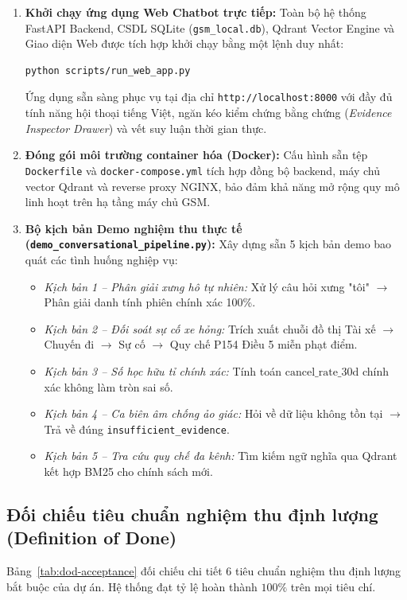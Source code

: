 \documentclass[a4paper,11pt]{article}
\begin{document}
\begin{enumerate}[leftmargin=1.5em]
    \item \textbf{Khởi chạy ứng dụng Web Chatbot trực tiếp:}
    Toàn bộ hệ thống FastAPI Backend, CSDL SQLite (\nolinkurl{gsm_local.db}), Qdrant Vector Engine và Giao diện Web được tích hợp khởi chạy bằng một lệnh duy nhất:
    \begin{lstlisting}[language=bash]
python scripts/run_web_app.py
    \end{lstlisting}
    Ứng dụng sẵn sàng phục vụ tại địa chỉ \nolinkurl{http://localhost:8000} với đầy đủ tính năng hội thoại tiếng Việt, ngăn kéo kiểm chứng bằng chứng (\textit{Evidence Inspector Drawer}) và vết suy luận thời gian thực.

    \item \textbf{Đóng gói môi trường container hóa (Docker):}
    Cấu hình sẵn tệp \nolinkurl{Dockerfile} và \nolinkurl{docker-compose.yml} tích hợp đồng bộ backend, máy chủ vector Qdrant và reverse proxy NGINX, bảo đảm khả năng mở rộng quy mô linh hoạt trên hạ tầng máy chủ GSM.

    \item \textbf{Bộ kịch bản Demo nghiệm thu thực tế (\nolinkurl{demo_conversational_pipeline.py}):}
    Xây dựng sẵn 5 kịch bản demo bao quát các tình huống nghiệp vụ:
    \begin{itemize}[noitemsep]
        \item \textit{Kịch bản 1 -- Phân giải xưng hô tự nhiên:} Xử lý câu hỏi xưng "tôi" $\to$ Phân giải danh tính phiên chính xác 100\%.
        \item \textit{Kịch bản 2 -- Đối soát sự cố xe hỏng:} Trích xuất chuỗi đồ thị Tài xế $\to$ Chuyến đi $\to$ Sự cố $\to$ Quy chế P154 Điều 5 miễn phạt điểm.
        \item \textit{Kịch bản 3 -- Số học hữu tỉ chính xác:} Tính toán $\text{cancel\_rate\_30d}$ chính xác không làm tròn sai số.
        \item \textit{Kịch bản 4 -- Ca biên âm chống ảo giác:} Hỏi về dữ liệu không tồn tại $\to$ Trả về đúng \nolinkurl{insufficient_evidence}.
        \item \textit{Kịch bản 5 -- Tra cứu quy chế đa kênh:} Tìm kiếm ngữ nghĩa qua Qdrant kết hợp BM25 cho chính sách mới.
    \end{itemize}
\end{enumerate}

\subsection{Đối chiếu tiêu chuẩn nghiệm thu định lượng (Definition of Done)}
Bảng~\ref{tab:dod-acceptance} đối chiếu chi tiết 6 tiêu chuẩn nghiệm thu định lượng bắt buộc của dự án. Hệ thống đạt tỷ lệ hoàn thành $100\%$ trên mọi tiêu chí.
\end{document}
